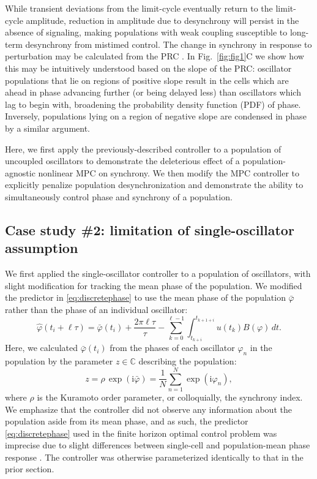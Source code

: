 While transient deviations from the limit-cycle eventually return to the limit-cycle amplitude, reduction in amplitude due to desynchrony will persist in the absence of signaling, making populations with weak coupling susceptible to long-term desynchrony from mistimed control.
The change in synchrony in response to perturbation may be calculated from the PRC \cite{StJohn2014b}.
In Fig.~\ref{fig:fig1}C we show how this may be intuitively understood based on the slope of the PRC: oscillator populations that lie on regions of positive slope result in the cells which are ahead in phase advancing further (or being delayed less) than oscillators which lag to begin with, broadening the probability density function (PDF) of phase.
Inversely, populations lying on a region of negative slope are condensed in phase by a similar argument.

Here, we first apply the previously-described controller to a population of uncoupled oscillators to demonstrate the deleterious effect of a population-agnostic nonlinear MPC on synchrony.
We then modify the MPC controller to explicitly penalize population desynchronization and demonstrate the ability to simultaneously control phase and synchrony of a population.

\subsection*{Case study \#2: limitation of single-oscillator assumption\label{ssec:scpop}}

We first applied the single-oscillator controller to a population of oscillators, with slight modification for tracking the mean phase of the population.
We modified the predictor in \eqref{eq:discretephase} to use the mean phase of the population $\bar{\varphi}$ rather than the phase of an individual oscillator:
\begin{equation}\label{eq:poppredictor}
    \hat\varphi(t_i+\ell\tau) = \bar{\varphi}(t_i) + \frac{2\pi\ell\tau}{\tau}-\sum_{k=0}^{\ell-1} \int_{t_{k+i}}^{t_{k+1+i}} u(t_k)B(\varphi)\, dt.
\end{equation}
Here, we calculated $\bar{\varphi}(t_i)$ from the phases of each oscillator $\varphi_n$ in the population by the parameter $z\in\mathbb C$ describing the population:
\begin{equation}
    z = \rho\,\exp(\mathrm{i}\bar{\varphi}) = \frac{1}{N}\sum_{n=1}^{N}\exp(\mathrm{i}\varphi_n),
\end{equation}
where $\rho$ is the Kuramoto order parameter, or colloquially, the synchrony index.
We emphasize that the controller did not observe any information about the population aside from its mean phase, and as such, the predictor \eqref{eq:discretephase} used in the finite horizon optimal control problem was imprecise due to slight differences between single-cell and population-mean phase response \cite{StJohn2014b}.
The controller was otherwise parameterized identically to that in the prior section.

